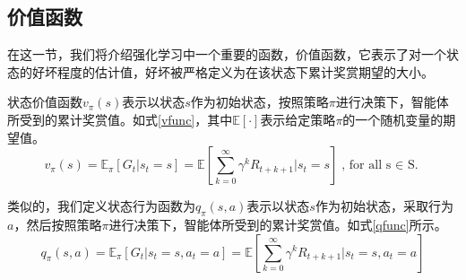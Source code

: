 \documentclass{standalone}
\begin{document}
\subsection{价值函数}
在这一节，我们将介绍强化学习中一个重要的函数，价值函数，它表示了对一个状态的好坏程度的估计值，好坏被严格定义为在该状态下累计奖赏期望的大小。\par
状态价值函数$v_{\pi}(s)$表示以状态$s$作为初始状态，按照策略$\pi$进行决策下，智能体所受到的累计奖赏值。如式\ref{vfunc}，其中$\mathbb{E[\cdot]}$表示给定策略$\pi$的一个随机变量的期望值。
    \begin{equation}
    \label{vfunc}
        v_{\pi}(s) = \mathbb{E}_{\pi}[G_t|s_t=s] = \mathbb{E}[\sum_{k=0}^{\infty}{\gamma^k{R_{t+k+1}}}|s_t=s]
        \mbox{, for all s $\in$ S.}
    \end{equation}
\par
类似的，我们定义状态行为函数为$q_{\pi}(s,a)$表示以状态$s$作为初始状态，采取行为$a$，然后按照策略$\pi$进行决策下，智能体所受到的累计奖赏值。如式\ref{qfunc}所示。
    \begin{equation}
    \label{qfunc}
        q_{\pi}(s,a) = \mathbb{E}_{\pi}[G_t|s_t=s, a_t=a] = \mathbb{E}[\sum_{k=0}^{\infty}{\gamma^k{R_{t+k+1}}}|s_t=s, a_t=a]
    \end{equation}
\end{document}
